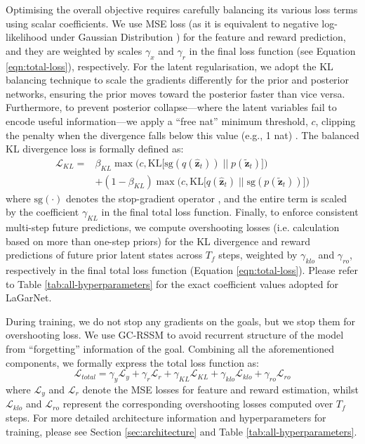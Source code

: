 \documentclass[journal]{IEEEtran}
\begin{document}
Optimising the overall objective requires carefully balancing its various loss terms using scalar coefficients. We use MSE loss (as it is equivalent to negative log-likelihood under Gaussian Distribution \cite{goodfellow2016deep}) for the feature and reward prediction, and they are weighted by scales $\gamma_x$ and $\gamma_r$ in the final loss function (see Equation \ref{eqn:total-loss}), respectively. For the latent regularisation, we adopt the KL balancing technique \cite{hafner2021mastering} to scale the gradients differently for the prior and posterior networks, ensuring the prior moves toward the posterior faster than vice versa. Furthermore, to prevent posterior collapse---where the latent variables fail to encode useful information---we apply a ``free nat'' minimum threshold, $c$, clipping the penalty when the divergence falls below this value (e.g., 1 nat) \cite{hafner2019learning}. The balanced KL divergence loss is formally defined as:
\begin{equation}
\begin{aligned}
    \mathcal{L}_{KL} = &\beta_{KL} \max\Big(c, \text{KL}\big[\text{sg}(q(\hat{\bm{z}}_t)) \;\big|\big|\; p(\tilde{\bm{z}}_t)\big]\Big) \\ 
    &+ (1 - \beta_{KL}) \max\Big(c, \text{KL}\big[q(\hat{\bm{z}}_t) \;\big|\big|\; \text{sg}(p(\tilde{\bm{z}}_t))\big]\Big)
\end{aligned} \label{eqn:kl-balance}
\end{equation}
where $\text{sg}(\cdot)$ denotes the stop-gradient operator \cite{hafner2025mastering}, and the entire term is scaled by the coefficient $\gamma_{KL}$ in the final total loss function. Finally, to enforce consistent multi-step future predictions, we compute overshooting losses (i.e. calculation based on more than one-step priors) for the KL divergence and reward predictions of future prior latent states across $T_f$ steps, weighted by $\gamma_{klo}$ and $\gamma_{ro}$, respectively in the final total loss function (Equation \ref{eqn:total-loss}). Please refer to Table \ref{tab:all-hyperparameters} for the exact coefficient values adopted for LaGarNet.

During training, we do not stop any gradients on the goals, but we stop them for overshooting loss. We use GC-RSSM to avoid recurrent structure of the model from ``forgetting'' information of the goal. Combining all the aforementioned components, we formally express the total loss function as:
\begin{equation}
    \mathcal{L}_{total} = \gamma_y \mathcal{L}_y + \gamma_r \mathcal{L}_r + \gamma_{KL} \mathcal{L}_{KL} + \gamma_{klo} \mathcal{L}_{klo} + \gamma_{ro} \mathcal{L}_{ro} \label{eqn:total-loss}
\end{equation}
where $\mathcal{L}_y$ and $\mathcal{L}_r$ denote the MSE losses for feature and reward estimation, whilst $\mathcal{L}_{klo}$ and $\mathcal{L}_{ro}$ represent the corresponding overshooting losses computed over $T_f$ steps. For more detailed architecture information and hyperparameters for training, please see Section \ref{sec:architecture} and Table \ref{tab:all-hyperparameters}.
\end{document}
